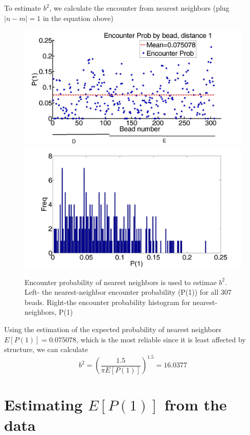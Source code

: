 \documentclass[12pt]{book}
\begin{document}
To estimate $b^2$, we calculate the encounter from nearest neighbors (plug $|n-m|=1$ in the equation above)
\begin{figure}[H]
\includegraphics[scale=0.1]{encoutnerProbByDist307BeadsAverageData}
\includegraphics[scale=0.1]{encounterProbHistogramDist1}
\caption{\scriptsize{Encounter probability of nearest neighbors is used to estimae $b^2$. Left- the nearest-neighbor encounter probability (P(1)) for all 307 beads. Right-the encounter probability histogram for nearest-neighbors, P(1)}}\label{figure_nearestNeighborProb}
\end{figure}
Using the estimation of the expected probability of nearest neighbors $E[P(1)]=0.075078$, which is the most reliable since it is least affected by structure, we can calculate
\begin{equation*}
b^2 = \left(\frac{1.5}{\pi E[P(1)]}\right)^{1.5}=16.0377
\end{equation*}

\section{Estimating $E[P(1)]$ from the data}
\end{document}
